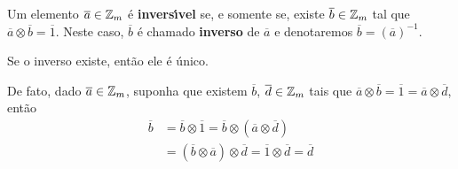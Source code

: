 \documentclass{beamer}
\begin{document}
    \begin{frame}
        \begin{definicao}
            Um elemento $\overline{a} \in \mathbb{Z}_m$ {\'e} \textbf{invers{\'\i}vel} se, e somente se, existe $\overline{b} \in \mathbb{Z}_m$ tal que $\overline{a} \otimes \overline{b} = \overline{1}$. Neste caso, $\overline{b}$ {\'e} chamado \textbf{inverso} de $\overline{a}$ e denotaremos $\overline{b} = (\overline{a})^{-1}$.
        \end{definicao}

        \begin{proposicao}
            Se o inverso existe, ent\~ao ele {\'e} {\'u}nico.
        \end{proposicao}
        \begin{prova}
            De fato, dado $\overline{a} \in \mathbb{Z}_m$, suponha que existem $\overline{b}$, $\overline{d} \in \mathbb{Z}_m$ tais que $\overline{a} \otimes \overline{b} = \overline{1} = \overline{a} \otimes \overline{d}$, ent{\~a}o
            \begin{align*}
                \overline{b} &= \overline{b} \otimes \overline{1} = \overline{b} \otimes (\overline{a} \otimes \overline{d})\\ &= (\overline{b} \otimes \overline{a}) \otimes \overline{d} = \overline{1} \otimes \overline{d} = \overline{d}
            \end{align*}
        \end{prova}
    \end{frame}
\end{document}
